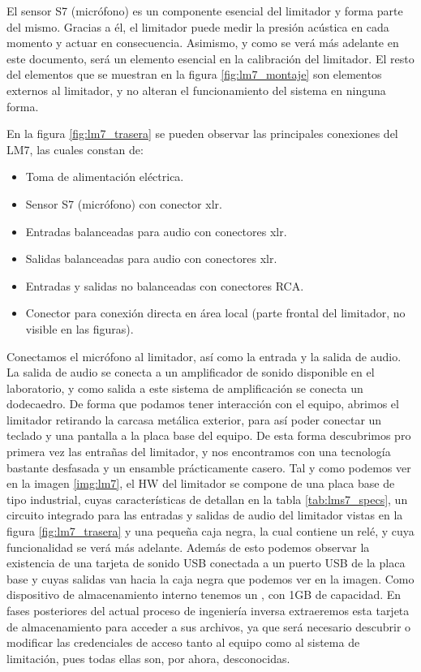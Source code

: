 El sensor S7 (micrófono) es un componente esencial del limitador y forma parte del mismo. Gracias a él, el limitador puede medir la presión acústica en cada momento y actuar en consecuencia. Asimismo, y como se verá más adelante en este documento, será un elemento esencial en la calibración del limitador. El resto del elementos que se muestran en la figura \ref{fig:lm7_montaje} son elementos externos al limitador, y no alteran el funcionamiento del sistema en ninguna forma.

En la figura \ref{fig:lm7_trasera} se pueden observar las principales conexiones del \acrshort{LM7}, las cuales constan de:

\begin{itemize}
    \item Toma de alimentación eléctrica.
    \item Sensor S7 (micrófono) con conector \acrshort{xlr}.
    \item Entradas balanceadas para audio con conectores \acrshort{xlr}.
    \item Salidas balanceadas para audio con conectores \acrshort{xlr}.
    \item Entradas y salidas no balanceadas con conectores \gls{RCA}.
    \item Conector  para conexión directa en área local (parte frontal del limitador, no visible en las figuras).
\end{itemize}

Conectamos el micrófono al limitador, así como la entrada y la salida de audio. La salida de audio se conecta a un amplificador de sonido disponible en el laboratorio, y como salida a este sistema de amplificación se conecta un dodecaedro. De forma que podamos tener interacción con el equipo, abrimos el limitador retirando la carcasa metálica exterior, para así poder conectar un teclado y una pantalla a la placa base del equipo. De esta forma descubrimos pro primera vez las entrañas del limitador, y nos encontramos con una tecnología bastante desfasada y un ensamble prácticamente casero. Tal y como podemos ver en la imagen \ref{img:lm7}, el \gls{HW} del limitador se compone de una placa base de tipo industrial, cuyas características de detallan en la tabla \ref{tab:lms7_specs}, un circuito integrado para las entradas y salidas de audio del limitador vistas en la figura \ref{fig:lm7_trasera} y una pequeña caja negra, la cual contiene un relé, y cuya funcionalidad se verá más adelante. Además de esto podemos observar la existencia de una tarjeta de sonido \acrshort{USB} conectada a un puerto \acrshort{USB} de la placa base y cuyas salidas van hacia la caja negra que podemos ver en la imagen. Como dispositivo de almacenamiento interno tenemos un , con 1GB de capacidad. En fases posteriores del actual proceso de ingeniería inversa extraeremos esta tarjeta de almacenamiento para acceder a sus archivos, ya que será necesario descubrir o modificar las credenciales de acceso tanto al equipo como al sistema de limitación, pues todas ellas son, por ahora, desconocidas.

